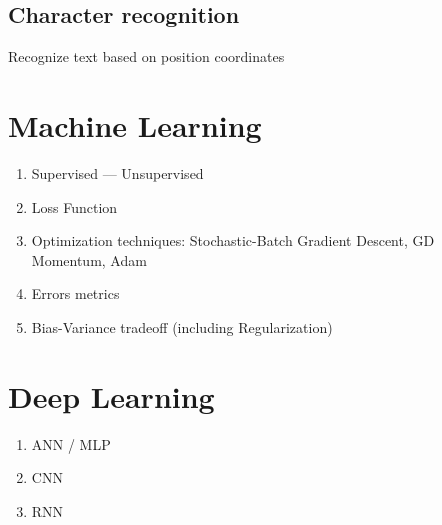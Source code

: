 \subsection{Character recognition}
Recognize text based on position coordinates

\section{Machine Learning}
\begin{enumerate}
    \item Supervised --- Unsupervised
    \item Loss Function
    \item Optimization techniques: Stochastic-Batch Gradient Descent, GD Momentum, Adam
    \item Errors metrics
    \item Bias-Variance tradeoff (including Regularization)
\end{enumerate}


\section{Deep Learning}
\begin{enumerate}
    \item ANN / MLP %
    \item CNN %
    \item RNN %
\end{enumerate}
